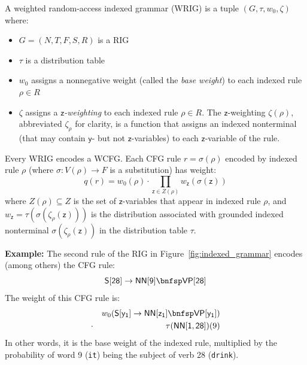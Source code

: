 \documentclass[11pt]{article}
\renewcommand{\bnfpn}[1]{\mathsf{#1}}
\renewcommand{\bnfpo}{\rightarrow}
\begin{document}
A weighted random-access indexed grammar (WRIG) is a tuple $(G, \tau, w_0, \zeta)$ where:
\begin{itemize}
	\item $G = (N, T, F, S, R)$ is a RIG
	\item $\tau$ is a distribution table
	\item $w_0$ assigns a nonnegative weight (called the \emph{base weight}) to each indexed rule $\rho \in R$
	\item $\zeta$ assigns a \emph{$\bnfpn{z}$-weighting} to each indexed rule $\rho \in R$. The $\bnfpn{z}$-weighting $\zeta(\rho)$, abbreviated $\zeta_\rho$ for clarity, is a function that assigns an indexed nonterminal (that may contain $\bnfpn{y}$- but not $\bnfpn{z}$-variables) to each $\bnfpn{z}$-variable of the rule. 
\end{itemize}
Every WRIG encodes a WCFG. Each CFG rule $r = \sigma(\rho)$ encoded by indexed rule $\rho$ (where $\sigma: V(\rho) \rightarrow F$ is a substitution) has weight:
\begin{equation*}
	q(r) = w_0(\rho) \cdot \prod\limits_{\bnfpn{z} \in Z(\rho)} w_{\bnfpn{z}}(\sigma(\bnfpn{z}))
\end{equation*}
\noindent where $Z(\rho) \subseteq Z$ is the set of $\bnfpn{z}$-variables that appear in indexed rule $\rho$, and $w_{\bnfpn{z}} = \tau(\sigma(\zeta_\rho(\bnfpn{z})))$ is the distribution associated with grounded indexed nonterminal $\sigma(\zeta_\rho(\bnfpn{z}))$ in the distribution table $\tau$.


\textbf{Example: } The second rule of the RIG in Figure~\ref{fig:indexed_grammar} encodes (among others) the CFG rule:
\begin{equation*}
\bnfpn{S[28]} \bnfpo \bnfpn{NN[9]} \bnfsp \bnfpn{VP[28]}
\end{equation*}
The weight of this CFG rule is:
\begin{eqnarray*}
&& w_0(\bnfpn{S[y_1]} \bnfpo \bnfpn{NN[z_1]} \bnfsp \bnfpn{VP[y_1]}) \\
&\cdot& \tau({\bnfpn{NN[1, 28]}})(9)
\end{eqnarray*}
In other words, it is the base weight of the indexed rule, multiplied by the probability of word 9 (\texttt{it}) being the subject of verb 28 (\texttt{drink}).
\end{document}
